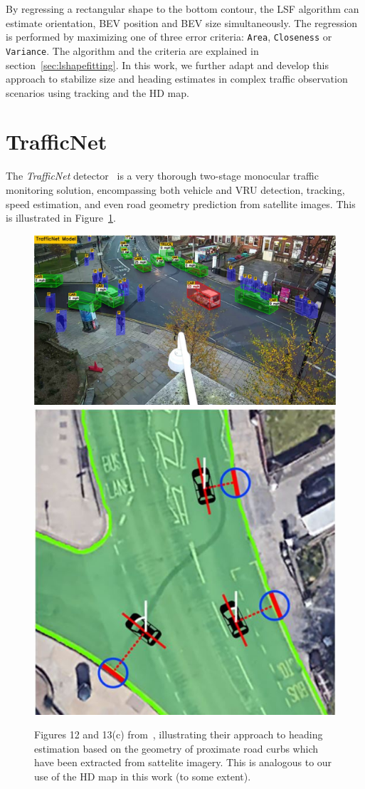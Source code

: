 By regressing a rectangular shape to the bottom contour, the LSF algorithm can estimate orientation, BEV position and BEV size simultaneously.
The regression is performed by maximizing one of three error criteria: \texttt{Area}, \texttt{Closeness} or \texttt{Variance}.
The algorithm and the criteria are explained in section~\ref{sec:lshapefitting}.
In this work, we further adapt and develop this approach to stabilize size and heading estimates in complex traffic observation scenarios using tracking and the HD map.

\section{TrafficNet}
\label{sec:related-trafficnet}

The \textit{TrafficNet} detector~\cite{rezaei2021traffic} is a very thorough two-stage monocular traffic monitoring solution, encompassing both vehicle and VRU detection, tracking, speed estimation, and even road geometry prediction from satellite images.
This is illustrated in Figure~\ref{fig:related-tranet}.

\begin{figure}[htb]
    \centering
    \includegraphics[width=0.63\linewidth]{figures/tranet}
    \includegraphics[width=0.35\linewidth]{figures/tranet-angle-estimation}
    \caption{Figures 12 and 13(c) from~\cite{rezaei2021traffic}, illustrating their approach to heading estimation based on the geometry of proximate road curbs which have been extracted from sattelite imagery. This is analogous to our use of the HD map in this work (to some extent).}
    \label{fig:related-tranet}
\end{figure}

